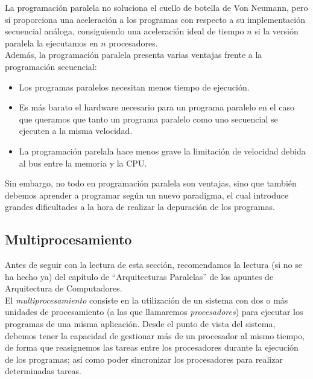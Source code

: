 La programación paralela no soluciona el cuello de botella de Von Neumann, pero sí proporciona una aceleración a los programas con respecto a su implementación secuencial análoga, consiguiendo una aceleración ideal de tiempo $n$ si la versión paralela la ejecutamos en $n$ procesadores.\\

Además, la programación paralela presenta varias ventajas frente a la programación secuencial:
\begin{itemize}
    \item Los programas paralelos necesitan menos tiempo de ejecución.
    \item Es más barato el hardware necesario para un programa paralelo en el caso que queramos que tanto un programa paralelo como uno secuencial se ejecuten a la misma velocidad.
    \item La programación parelala hace menos grave la limitación de velocidad debida al bus entre la memoria y la CPU\@.
\end{itemize}

Sin embargo, no todo en programación paralela son ventajas, sino que también debemos aprender a programar según un nuevo paradigma, el cual introduce grandes dificultades a la hora de realizar la depuración de los programas.

\subsection{Multiprocesamiento}
Antes de seguir con la lectura de esta sección, recomendamos la lectura (si no se ha hecho ya) del capítulo de ``Arquitecturas Paralelas'' de los apuntes de Arquitectura de Computadores.\\

El \textit{multiprocesamiento} consiste en la utilización de un sistema con dos o más unidades de procesamiento (a las que llamaremos \textit{procesadores}) para ejecutar los programas de una misma aplicación. Desde el punto de vista del sistema, debemos tener la capacidad de gestionar más de un procesador al mismo tiempo, de forma que reasignemos las tareas entre los procesadores durante la ejecución de los programas; así como poder sincronizar los procesadores para realizar determinadas tareas.\\

